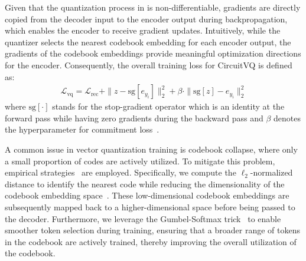 Given that the quantization process in  is non-differentiable, gradients are directly copied from the decoder input to the encoder output during backpropagation, which enables the encoder to receive gradient updates.
Intuitively, while the quantizer selects the nearest codebook embedding for each encoder output, the gradients of the codebook embeddings provide meaningful optimization directions for the encoder. 
Consequently, the overall training loss for CircuitVQ is defined as:
\begin{align}
	\mathcal{L}_\text{vq} = \mathcal{L}_\text{rec} + \| z - \text{sg}[e_{y_{i}}] \|_2^2 + \beta \cdot \| \text{sg}[z] - e_{y_{i}} \|_2^2
\end{align}
where $\mathrm{sg}[\cdot]$ stands for the stop-gradient operator which is an identity at the forward pass while having zero gradients during the backward pass and $\beta$ denotes the hyperparameter for commitment loss~\cite{van2017vqvae}.

A common issue in vector quantization training is codebook collapse, where only a small proportion of codes are actively utilized.
To mitigate this problem, empirical strategies~\cite{yu2021vqgan_i,jang2016gumbel} are employed. 
Specifically, we compute the $\ell_2$-normalized distance to identify the nearest code while reducing the dimensionality of the codebook embedding space~\cite{yu2021vqgan_i}. 
These low-dimensional codebook embeddings are subsequently mapped back to a higher-dimensional space before being passed to the decoder.
Furthermore, we leverage the Gumbel-Softmax trick~\cite{jang2016gumbel} to enable smoother token selection during training, ensuring that a broader range of tokens in the codebook are actively trained, thereby improving the overall utilization of the codebook.


